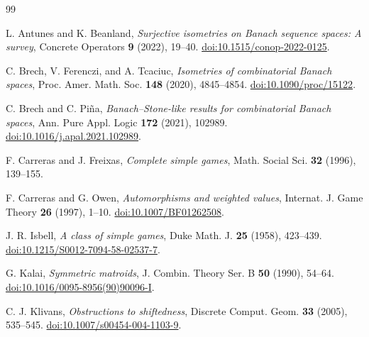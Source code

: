 \documentclass[11pt]{article}
\theoremstyle{definition}
\theoremstyle{remark}
\begin{document}
\begin{thebibliography}{99}

L. Antunes and K. Beanland,
\emph{Surjective isometries on Banach sequence spaces: A survey},
Concrete Operators \textbf{9} (2022), 19--40.
\href{https://doi.org/10.1515/conop-2022-0125}{doi:10.1515/conop-2022-0125}.

C. Brech, V. Ferenczi, and A. Tcaciuc,
\emph{Isometries of combinatorial Banach spaces},
Proc. Amer. Math. Soc. \textbf{148} (2020), 4845--4854.
\href{https://doi.org/10.1090/proc/15122}{doi:10.1090/proc/15122}.

C. Brech and C. Pi\~na,
\emph{Banach--Stone-like results for combinatorial Banach spaces},
Ann. Pure Appl. Logic \textbf{172} (2021), 102989.
\href{https://doi.org/10.1016/j.apal.2021.102989}{doi:10.1016/j.apal.2021.102989}.

F. Carreras and J. Freixas,
\emph{Complete simple games},
Math. Social Sci. \textbf{32} (1996), 139--155.

F. Carreras and G. Owen,
\emph{Automorphisms and weighted values},
Internat. J. Game Theory \textbf{26} (1997), 1--10.
\href{https://doi.org/10.1007/BF01262508}{doi:10.1007/BF01262508}.

J. R. Isbell,
\emph{A class of simple games},
Duke Math. J. \textbf{25} (1958), 423--439.
\href{https://doi.org/10.1215/S0012-7094-58-02537-7}{doi:10.1215/S0012-7094-58-02537-7}.

G. Kalai,
\emph{Symmetric matroids},
J. Combin. Theory Ser. B \textbf{50} (1990), 54--64.
\href{https://doi.org/10.1016/0095-8956(90)90096-I}{doi:10.1016/0095-8956(90)90096-I}.

C. J. Klivans,
\emph{Obstructions to shiftedness},
Discrete Comput. Geom. \textbf{33} (2005), 535--545.
\href{https://doi.org/10.1007/s00454-004-1103-9}{doi:10.1007/s00454-004-1103-9}.

\end{thebibliography}
\end{document}
